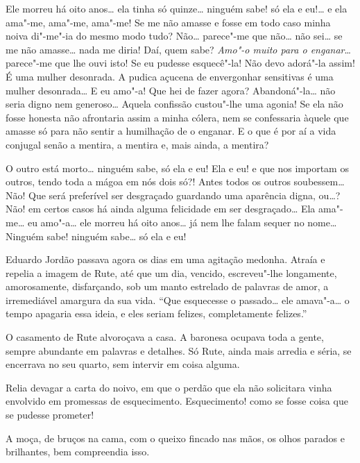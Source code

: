Ele morreu há oito anos\ldots{} ela tinha só quinze\ldots{} ninguém sabe! só ela e
eu!\ldots{} e ela ama"-me, ama"-me, ama"-me! Se me não amasse e fosse em todo
caso minha noiva di"-me"-ia do mesmo modo tudo? Não\ldots{} parece"-me que
não\ldots{} não sei\ldots{} se me não amasse\ldots{} nada me diria! Daí, quem sabe?
\emph{Amo"-o muito para o enganar}\ldots{} parece"-me que lhe ouvi isto! Se eu
pudesse esquecê"-la! Não devo adorá"-la assim! É uma mulher desonrada. A
pudica açucena de envergonhar sensitivas é uma mulher desonrada\ldots{} E eu
amo"-a! Que hei de fazer agora? Abandoná"-la\ldots{} não seria digno nem
generoso\ldots{} Aquela confissão custou"-lhe uma agonia! Se ela não fosse
honesta não afrontaria assim a minha cólera, nem se confessaria àquele
que amasse só para não sentir a humilhação de o enganar. E o que é por
aí a vida conjugal senão a mentira, a mentira e, mais ainda, a mentira?

O outro está morto\ldots{} ninguém sabe, só ela e eu! Ela e eu! e que nos
importam os outros, tendo toda a mágoa em nós dois só?! Antes todos os
outros soubessem\ldots{} Não! Que será preferível ser desgraçado guardando
uma aparência digna, ou\ldots{}? Não! em certos casos há ainda alguma
felicidade em ser desgraçado\ldots{} Ela ama"-me\ldots{} eu amo"-a\ldots{} ele morreu há
oito anos\ldots{} já nem lhe falam sequer no nome\ldots{} Ninguém sabe! ninguém
sabe\ldots{} só ela e eu!

Eduardo Jordão passava agora os dias em uma agitação medonha. Atraía e
repelia a imagem de Rute, até que um dia, vencido, escreveu"-lhe
longamente, amorosamente, disfarçando, sob um manto estrelado de
palavras de amor, a irremediável amargura da sua vida. ``Que esquecesse
o passado\ldots{} ele amava"-a\ldots{} o tempo apagaria essa ideia, e eles seriam
felizes, completamente felizes.''

O casamento de Rute alvoroçava a casa. A baronesa ocupava toda a gente,
sempre abundante em palavras e detalhes. Só Rute, ainda mais arredia e
séria, se encerrava no seu quarto, sem intervir em coisa alguma.

Relia devagar a carta do noivo, em que o perdão que ela não solicitara
vinha envolvido em promessas de esquecimento. Esquecimento! como se
fosse coisa que se pudesse prometer!

A moça, de bruços na cama, com o queixo fincado nas mãos, os olhos
parados e brilhantes, bem compreendia isso.

